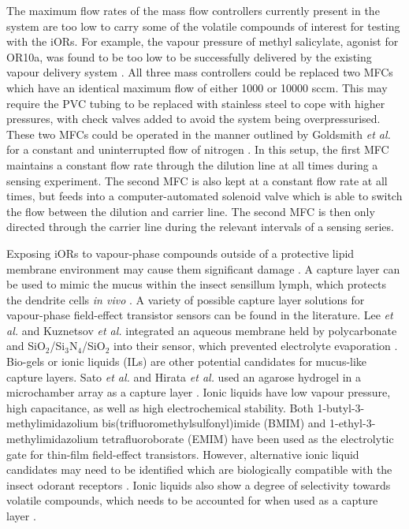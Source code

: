 \documentclass[
  a4paper,
]{scrbook}
\begin{document}
The maximum flow rates of the mass flow controllers currently present in
the system are too low to carry some of the volatile compounds of
interest for testing with the iORs. For example, the vapour pressure of
methyl salicylate, agonist for OR10a, was found to be too low to be
successfully delivered by the existing vapour delivery system
\autocite{MeSal}. All three mass controllers could be replaced two MFCs
which have an identical maximum flow of either 1000 or 10000 sccm. This
may require the PVC tubing to be replaced with stainless steel to cope
with higher pressures, with check valves added to avoid the system being
overpressurised. These two MFCs could be operated in the manner outlined
by Goldsmith \emph{et al.} for a constant and uninterrupted flow of
nitrogen \autocite{Goldsmith2011}. In this setup, the first MFC
maintains a constant flow rate through the dilution line at all times
during a sensing experiment. The second MFC is also kept at a constant
flow rate at all times, but feeds into a computer-automated solenoid
valve which is able to switch the flow between the dilution and carrier
line. The second MFC is then only directed through the carrier line
during the relevant intervals of a sensing series.

Exposing iORs to vapour-phase compounds outside of a protective lipid
membrane environment may cause them significant damage
\autocite{Sato2014,Warden2019}. A capture layer can be used to mimic the
mucus within the insect sensillum lymph, which protects the dendrite
cells \emph{in vivo} \autocite{Shkodra2021,Sato2014,Hurot2020,Cali2020}.
A variety of possible capture layer solutions for vapour-phase
field-effect transistor sensors can be found in the literature. Lee
\emph{et al.} and Kuznetsov \emph{et al.} integrated an aqueous membrane
held by polycarbonate and SiO\(_2\)/Si\(_3\)N\(_4\)/SiO\(_2\) into their
sensor, which prevented electrolyte evaporation
\autocite{Lee2015,Kuznetsov2018}. Bio-gels or ionic liquids (ILs) are
other potential candidates for mucus-like capture layers. Sato \emph{et
al.} and Hirata \emph{et al.} used an agarose hydrogel in a microchamber
array as a capture layer \autocite{Sato2014,Hirata2021}. Ionic liquids
have low vapour pressure, high capacitance, as well as high
electrochemical stability. Both 1-butyl-3-methylimidazolium
bis(trifluoromethylsulfonyl)imide (BMIM) \autocite{Hwang2014,White2015}
and 1-ethyl-3-methylimidazolium tetrafluoroborate (EMIM)
\autocite{Inaba2014,Kiga2012} have been used as the electrolytic gate
for thin-film field-effect transistors. However, alternative ionic
liquid candidates may need to be identified which are biologically
compatible with the insect odorant receptors
\autocite{Gomes2019,Shukla2020}. Ionic liquids also show a degree of
selectivity towards volatile compounds, which needs to be accounted for
when used as a capture layer \autocite{Kulkarni2007}.
\end{document}
